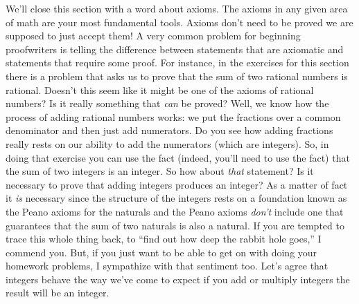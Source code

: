 \documentclass[10pt,]{book}
\theoremstyle{plain}
\theoremstyle{definition}
\theoremstyle{definition}
\numberwithin{equation}{section}
\begin{document}
\par

    We'll close this section with a word about axioms. The axioms in any
    given area of math are your most fundamental tools. Axioms don't
    need to be proved \textemdash{} we are supposed to just accept them! A very common
    problem for beginning proofwriters is telling the difference between statements
    that are axiomatic and statements that require some proof. For instance, in the
    exercises for this section there is a problem that asks us to prove that the sum of
    two rational numbers is rational. Doesn't this seem like it might be one of
    the axioms of rational numbers? Is it really something that \emph{can} be proved?
    Well, we know how the process of adding rational numbers works: we put the
    fractions over a common
    denominator and then just add numerators. Do you see how adding fractions really rests
    on our ability to add the numerators (which are integers). So, in doing that exercise you
    can use the fact (indeed, you'll need to use the fact) that the sum of two integers is an integer.
    So how about \emph{that} statement? Is it necessary to prove that adding integers produces
    an integer? As a matter of fact it \emph{is} necessary since the structure of the integers
    rests on a foundation known as the Peano axioms for the naturals \textemdash{} and the Peano axioms
    \emph{don't} include one that guarantees that the sum of two naturals is also a natural. If you
    are tempted to trace this whole thing back, to ``find out how deep the rabbit hole goes,'' I commend
    you. But, if you just want to be able to get on with doing your homework problems, I sympathize
    with that sentiment too. Let's agree that integers behave the way we've come to expect \textemdash{} if
    you add or multiply integers the result will be an integer.
\typeout{************************************************}
\typeout{************************************************}
\end{document}
